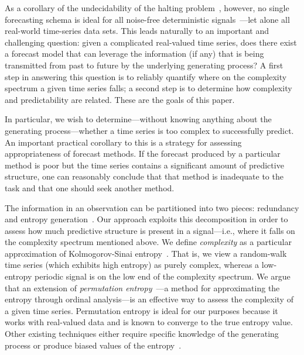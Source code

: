 As a corollary of the undecidability of the halting
problem~\cite{halting-problem}, however, no single forecasting schema
is ideal for all noise-free deterministic
signals~\cite{weigend93}---let alone all real-world time-series
data sets.  This leads naturally to an important and challenging
question: given a complicated real-valued time series, does there
exist a forecast model that can leverage the information (if any) that
is being transmitted from past to future by the underlying generating
process?  A first step in answering this question is to reliably
quantify where on the complexity spectrum a given time series falls; a
second step is to determine how complexity and predictability are
related.  These are the goals of this paper.

In particular, we wish to determine---without knowing anything about
the generating process---whether a time series is too complex to successfully
predict.  An important practical corollary to this is a strategy for
assessing appropriateness of forecast methods.  If the forecast
produced by a particular method is poor but the time series contains a
significant amount of predictive structure, one can reasonably conclude that that method is inadequate
to the task and that one should seek another method.

The information in an observation can be partitioned into two pieces:
redundancy and entropy generation~\cite{crutchfield2003}.
\label{page:redundancy}
Our approach exploits this decomposition in order to assess how much
predictive structure is present in a signal---i.e., where it falls on
the complexity spectrum mentioned above.  We define \emph{complexity}
as a particular approximation of Kolmogorov-Sinai
entropy~\cite{lind95}.  That is, we view a random-walk time series
(which exhibits high entropy) as purely complex, whereas a low-entropy
periodic signal is on the low end of the complexity spectrum.  We
argue that an extension of \emph{permutation
  entropy}~\cite{bandt2002per}---a method for approximating the
entropy through ordinal analysis---is an effective way to assess the
complexity of a given time series.  Permutation entropy is ideal for
our purposes because it works with real-valued data and is known to
converge to the true entropy value. Other existing techniques either
require specific knowledge of the generating process or produce biased
values of the entropy~\cite{bollt2001}.

